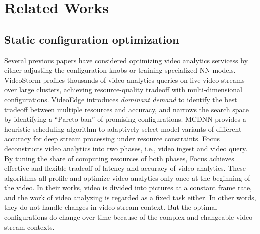 \section{Related Works}
\label{Section: related_works}

\subsection{Static configuration optimization}
Several previous papers have considered optimizing video analytics servicess by either adjusting the configuration knobs or training specialized NN models. VideoStorm \cite{zhang2017videostorm} profiles thousands of video analytics queries on live video streams over large clusters, achieving resource-quality tradeoff with multi-dimensional configurations. VideoEdge \cite{hung2018videoedge} introduces \emph{dominant demand} to identify the best tradeoff between multiple resources and accuracy, and narrows the search space by identifying a ``Pareto ban'' of promising configurations. MCDNN \cite{han2016mcdnn} provides a heuristic scheduling algorithm to adaptively select model variants of different accuracy for deep stream processing under resource constraints. Focus \cite{hsieh2018focus} deconstructs video analytics into two phases, i.e., video ingest and video query. By tuning the share of computing resources of both phases, Focus achieves effective and flexible tradeoff of latency and accuracy of video analytics. These algorithms all profile and optimize video analytics only once at the beginning of the video. In their works, video is divided into pictures at a constant frame rate, and the work of video analyzing is regarded as a fixed task either. In other words, they do not handle changes in video stream context. But the optimal configurations do change over time because of the complex and changeable video stream contexts.


